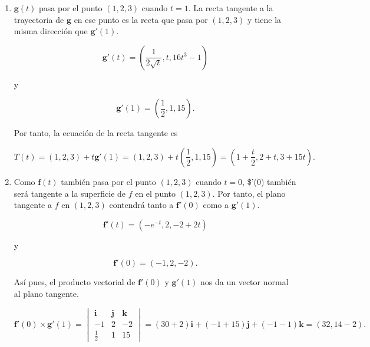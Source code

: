 \documentclass[
  a4paper,
]{scrreport}
\theoremstyle{definition}
\theoremstyle{remark}
\begin{document}
\begin{tcolorbox}[enhanced jigsaw, rightrule=.15mm, coltitle=black, colframe=quarto-callout-tip-color-frame, opacitybacktitle=0.6, bottomrule=.15mm, title=\textcolor{quarto-callout-tip-color}{\faLightbulb}\hspace{0.5em}{Solución}, opacityback=0, leftrule=.75mm, titlerule=0mm, colbacktitle=quarto-callout-tip-color!10!white, breakable, toprule=.15mm, left=2mm, colback=white, toptitle=1mm, arc=.35mm, bottomtitle=1mm]

\begin{enumerate}
\def\labelenumi{\alph{enumi}.}
\item
  \(\mathbf{g}(t)\) pasa por el punto \((1,2,3)\) cuando \(t=1\). La
  recta tangente a la trayectoria de \(\mathbf{g}\) en ese punto es la
  recta que pasa por \((1,2,3)\) y tiene la misma dirección que
  \(\mathbf{g}'(1)\).

  \[
  \mathbf{g}'(t) = \left(\frac{1}{2\sqrt{t}}, t, 16t^3-1\right)
  \]

  y

  \[
  \mathbf{g}'(1) = \left(\frac{1}{2}, 1, 15\right).
  \]

  Por tanto, la ecuación de la recta tangente es

  \[
  T(t) 
  = (1,2,3) + t \mathbf{g}'(1)
  = (1,2,3) + t \left(\frac{1}{2}, 1, 15\right)
  = \left(1+\frac{t}{2}, 2+t, 3+15t\right).
  \]
\item
  Como \(\mathbf{f}(t)\) también pasa por el punto \((1,2,3)\) cuando
  \(t=0\), \$'(0) también será tangente a la superficie de
  \(f\) en el punto \((1,2,3)\). Por tanto, el plano tangente a \(f\) en
  \((1,2,3)\) contendrá tanto a \(\mathbf{f}'(0)\) como a
  \(\mathbf{g}'(1)\).

  \[
  \mathbf{f}'(t) = (-e^{-t}, 2, -2+2t)
  \]

  y

  \[
  \mathbf{f}'(0) = (-1, 2, -2).
  \]

  Así pues, el producto vectorial de \(\mathbf{f}'(0)\) y
  \(\mathbf{g}'(1)\) nos da un vector normal al plano tangente.

  \[
  \mathbf{f}'(0) \times \mathbf{g}'(1) 
  = \begin{vmatrix}
  \mathbf{i} & \mathbf{j} & \mathbf{k} \\
  -1 & 2 & -2 \\
  \frac{1}{2} & 1 & 15
  \end{vmatrix}
  = (30 + 2)\mathbf{i} + (-1+ 15)\mathbf{j} + (- 1 - 1)\mathbf{k}
  = (32,14-2).
  \]


\end{enumerate}
\end{tcolorbox}
\end{document}
